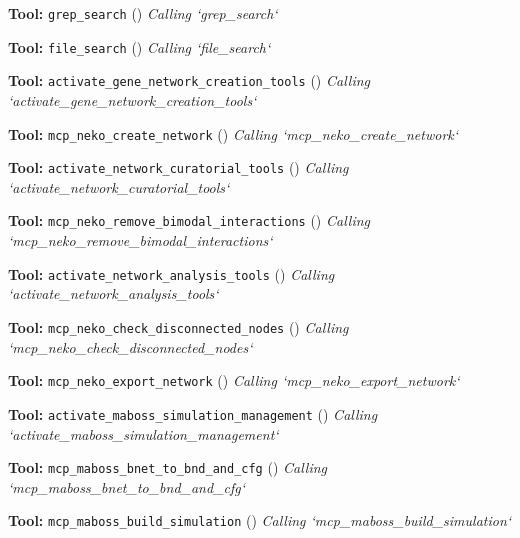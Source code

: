 \documentclass[11pt,a4paper]{article}
\begin{document}
\begin{toolokbox}
\textbf{Tool:} \texttt{grep\_search} (\checkmark)
\textit{Calling `grep\_search`}
\end{toolokbox}
\begin{toolokbox}
\textbf{Tool:} \texttt{file\_search} (\checkmark)
\textit{Calling `file\_search`}
\end{toolokbox}
\begin{toolokbox}
\textbf{Tool:} \texttt{activate\_gene\_network\_creation\_tools} (\checkmark)
\textit{Calling `activate\_gene\_network\_creation\_tools`}
\end{toolokbox}
\begin{toolokbox}
\textbf{Tool:} \texttt{mcp\_neko\_create\_network} (\checkmark)
\textit{Calling `mcp\_neko\_create\_network`}
\end{toolokbox}
\begin{toolokbox}
\textbf{Tool:} \texttt{activate\_network\_curatorial\_tools} (\checkmark)
\textit{Calling `activate\_network\_curatorial\_tools`}
\end{toolokbox}
\begin{toolokbox}
\textbf{Tool:} \texttt{mcp\_neko\_remove\_bimodal\_interactions} (\checkmark)
\textit{Calling `mcp\_neko\_remove\_bimodal\_interactions`}
\end{toolokbox}
\begin{toolokbox}
\textbf{Tool:} \texttt{activate\_network\_analysis\_tools} (\checkmark)
\textit{Calling `activate\_network\_analysis\_tools`}
\end{toolokbox}
\begin{toolokbox}
\textbf{Tool:} \texttt{mcp\_neko\_check\_disconnected\_nodes} (\checkmark)
\textit{Calling `mcp\_neko\_check\_disconnected\_nodes`}
\end{toolokbox}
\begin{toolokbox}
\textbf{Tool:} \texttt{mcp\_neko\_export\_network} (\checkmark)
\textit{Calling `mcp\_neko\_export\_network`}
\end{toolokbox}
\begin{toolokbox}
\textbf{Tool:} \texttt{activate\_maboss\_simulation\_management} (\checkmark)
\textit{Calling `activate\_maboss\_simulation\_management`}
\end{toolokbox}
\begin{toolokbox}
\textbf{Tool:} \texttt{mcp\_maboss\_bnet\_to\_bnd\_and\_cfg} (\checkmark)
\textit{Calling `mcp\_maboss\_bnet\_to\_bnd\_and\_cfg`}
\end{toolokbox}
\begin{toolokbox}
\textbf{Tool:} \texttt{mcp\_maboss\_build\_simulation} (\checkmark)
\textit{Calling `mcp\_maboss\_build\_simulation`}
\end{toolokbox}
\end{document}
